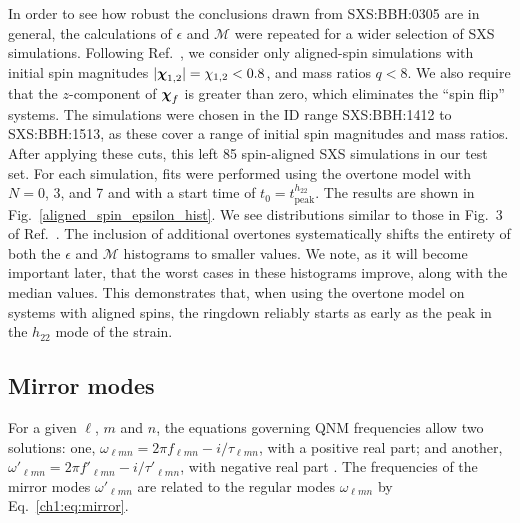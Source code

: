 In order to see how robust the conclusions drawn from SXS:BBH:0305 are in general, the calculations of $\epsilon$ and $\mathcal{M}$ were repeated for a wider selection of SXS simulations. Following Ref.~\cite{Giesler:2019uxc}, we consider only aligned-spin simulations with initial spin magnitudes $|\vb*{\chi}_{1,2}| = \chi_{1,2} < 0.8$, and mass ratios $q < 8$. We also require that the $z$-component of $\vb*{\chi}_f$ is greater than zero, which eliminates the ``spin flip'' systems. The simulations were chosen in the ID range SXS:BBH:1412 to SXS:BBH:1513, as these cover a range of initial spin magnitudes and mass ratios.
After applying these cuts, this left 85 spin-aligned SXS simulations in our test set.
For each simulation, fits were performed using the overtone model with $N=0$, 3, and 7 and with a start time of $t_0 = t_{\mathrm{peak}}^{h_{22}}$. 
The results are shown in Fig.~\ref{aligned_spin_epsilon_hist}. 
We see distributions similar to those in Fig.~3 of Ref.~\cite{Giesler:2019uxc}. 
The inclusion of additional overtones systematically shifts the entirety of both the $\epsilon$ and $\mathcal{M}$ histograms to smaller values.
We note, as it will become important later, that the worst cases in these histograms improve, along with the median values.
This demonstrates that, when using the overtone model on systems with aligned spins, the ringdown reliably starts as early as the peak in the $h_{22}$ mode of the strain. 


\subsection{Mirror modes} \label{subsec:mirror_modes}

For a given $\ell$, $m$ and $n$, the equations governing QNM frequencies allow two solutions: one, $\omega_{\ell m n} = 2\pi f_{\ell m n} - i/\tau_{\ell m n}$, with a positive real part; and another, $\omega'_{\ell m n} = 2\pi f'_{\ell m n} - i/ \tau'_{\ell m n}$, with negative real part \cite{Dhani:2020nik, Berti:2005ys}.
The frequencies of the mirror modes $\omega'_{\ell m n}$ are related to the regular modes $\omega_{\ell m n}$ by Eq.~\ref{ch1:eq:mirror}.

